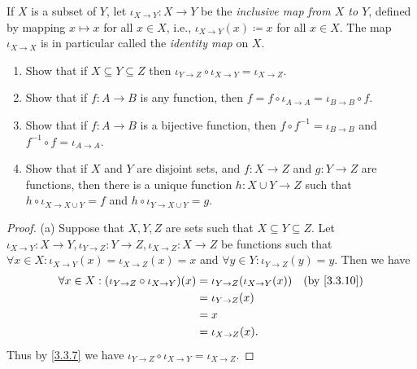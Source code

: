 \begin{ex}\label{ex:3.3.8}
  If \(X\) is a subset of \(Y\), let \(\iota_{X \to Y} : X \to Y\) be the \emph{inclusive map from \(X\) to \(Y\)}, defined by mapping \(x \mapsto x\) for all \(x \in X\), i.e., \(\iota_{X \to Y}(x) \coloneqq x\) for all \(x \in X\).
  The map \(\iota_{X \to X}\) is in particular called the \emph{identity map} on \(X\).
  \begin{enumerate}
    \item Show that if \(X \subseteq Y \subseteq Z\) then \(\iota_{Y \to Z} \circ \iota_{X \to Y} = \iota_{X \to Z}\).
    \item Show that if \(f : A \to B\) is any function, then \(f = f \circ \iota_{A \to A} = \iota_{B \to B} \circ f\).
    \item Show that if \(f : A \to B\) is a bijective function, then \(f \circ f^{-1} = \iota_{B \to B}\) and \(f^{-1} \circ f = \iota_{A \to A}\).
    \item Show that if \(X\) and \(Y\) are disjoint sets, and \(f : X \to Z\) and \(g : Y \to Z\) are functions, then there is a unique function \(h : X \cup Y \to Z\) such that \(h \circ \iota_{X \to X \cup Y} = f\) and \(h \circ \iota_{Y \to X \cup Y} = g\).
  \end{enumerate}
\end{ex}

\begin{proof}{(a)}
  Suppose that \(X, Y, Z\) are sets such that \(X \subseteq Y \subseteq Z\).
  Let \(\iota_{X \to Y} : X \to Y, \iota_{Y \to Z} : Y \to Z, \iota_{X \to Z} : X \to Z\) be functions such that \(\forall x \in X : \iota_{X \to Y}(x) = \iota_{X \to Z}(x) = x\) and \(\forall y \in Y : \iota_{Y \to Z}(y) = y\).
  Then we have
  \begin{align*}
    \forall x \in X : (\iota_{Y \to Z} \circ \iota_{X \to Y})(x) & = \iota_{Y \to Z}(\iota_{X \to Y}(x)) &  & \text{(by \cref{3.3.10})} \\
                                                                 & = \iota_{Y \to Z}(x)                                                 \\
                                                                 & = x                                                                  \\
                                                                 & = \iota_{X \to Z}(x).
  \end{align*}
  Thus by \cref{3.3.7} we have \(\iota_{Y \to Z} \circ \iota_{X \to Y} = \iota_{X \to Z}\).
\end{proof}

